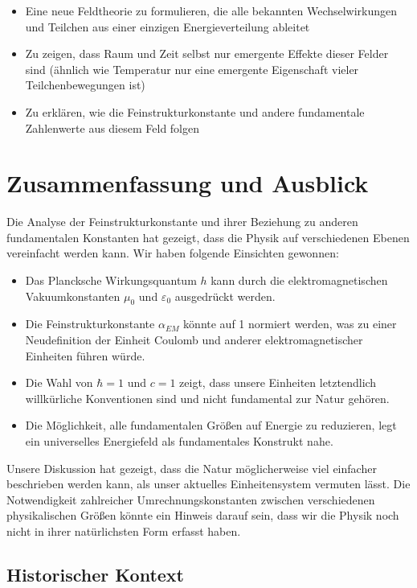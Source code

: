 \documentclass[12pt,a4paper]{article}
\begin{document}
	\begin{itemize}
		\item Eine neue Feldtheorie zu formulieren, die alle bekannten Wechselwirkungen und Teilchen aus einer einzigen Energieverteilung ableitet
		\item Zu zeigen, dass Raum und Zeit selbst nur emergente Effekte dieser Felder sind (ähnlich wie Temperatur nur eine emergente Eigenschaft vieler Teilchenbewegungen ist)
		\item Zu erklären, wie die Feinstrukturkonstante und andere fundamentale Zahlenwerte aus diesem Feld folgen
	\end{itemize}
	
	\section{Zusammenfassung und Ausblick}
	
	Die Analyse der Feinstrukturkonstante und ihrer Beziehung zu anderen fundamentalen Konstanten hat gezeigt, dass die Physik auf verschiedenen Ebenen vereinfacht werden kann. Wir haben folgende Einsichten gewonnen:
	
	\begin{itemize}
		\item Das Plancksche Wirkungsquantum $h$ kann durch die elektromagnetischen Vakuumkonstanten $\mu_0$ und $\varepsilon_0$ ausgedrückt werden.
		\item Die Feinstrukturkonstante $\alpha_{EM}$ könnte auf 1 normiert werden, was zu einer Neudefinition der Einheit Coulomb und anderer elektromagnetischer Einheiten führen würde.
		\item Die Wahl von $\hbar = 1$ und $c = 1$ zeigt, dass unsere Einheiten letztendlich willkürliche Konventionen sind und nicht fundamental zur Natur gehören.
		\item Die Möglichkeit, alle fundamentalen Größen auf Energie zu reduzieren, legt ein universelles Energiefeld als fundamentales Konstrukt nahe.
	\end{itemize}
	
	Unsere Diskussion hat gezeigt, dass die Natur möglicherweise viel einfacher beschrieben werden kann, als unser aktuelles Einheitensystem vermuten lässt. Die Notwendigkeit zahlreicher Umrechnungskonstanten zwischen verschiedenen physikalischen Größen könnte ein Hinweis darauf sein, dass wir die Physik noch nicht in ihrer natürlichsten Form erfasst haben.
	
	\subsection{Historischer Kontext}
	
\end{document}
